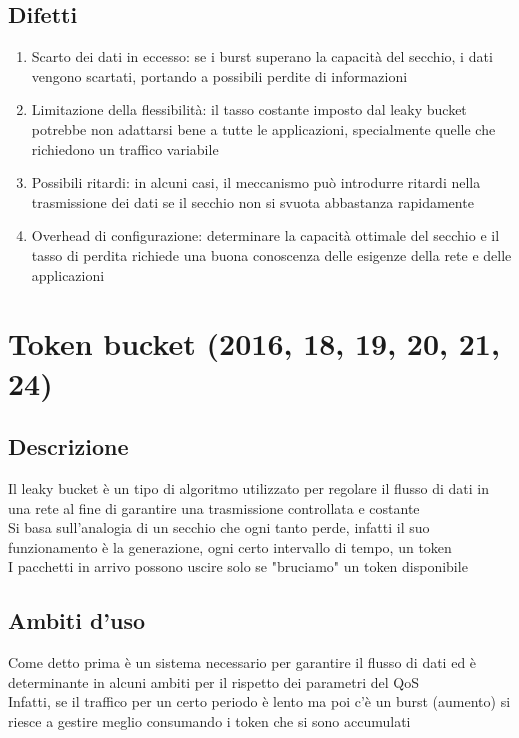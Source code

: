 \documentclass[10pt,oneside,a4paper]{article}
\begin{document}
\subsection{Difetti}
\begin{enumerate}
    \item Scarto dei dati in eccesso: se i burst superano la capacità del secchio, i dati vengono scartati, portando a possibili perdite di informazioni
    \item Limitazione della flessibilità: il tasso costante imposto dal leaky bucket potrebbe non adattarsi bene a tutte le applicazioni, specialmente quelle che richiedono un traffico variabile
    \item Possibili ritardi: in alcuni casi, il meccanismo può introdurre ritardi nella trasmissione dei dati se il secchio non si svuota abbastanza rapidamente
    \item Overhead di configurazione: determinare la capacità ottimale del secchio e il tasso di perdita richiede una buona conoscenza delle esigenze della rete e delle applicazioni
\end{enumerate}
\section{Token bucket (2016, 18, 19, 20, 21, 24)}
\subsection{Descrizione}
Il leaky bucket è un tipo di algoritmo utilizzato per regolare il flusso di dati in una rete al fine di garantire una trasmissione controllata e costante\\
Si basa sull'analogia di un secchio che ogni tanto perde, infatti il suo funzionamento è la generazione, ogni certo intervallo di tempo, un token\\
I pacchetti in arrivo possono uscire solo se "bruciamo" un token disponibile
\subsection{Ambiti d'uso}
Come detto prima è un sistema necessario per garantire il flusso di dati ed è determinante in alcuni ambiti per il rispetto dei parametri del QoS\\
Infatti, se il traffico per un certo periodo è lento ma poi c'è un burst (aumento) si riesce a gestire meglio consumando i token che si sono accumulati
\end{document}
